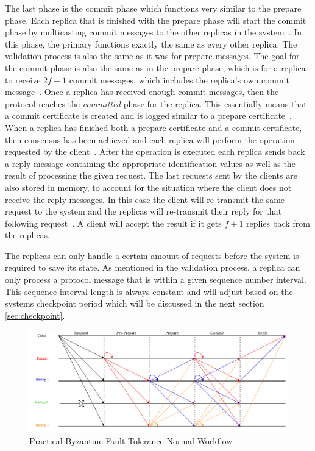 The last phase is the commit phase which functions very similar to the prepare phase. Each replica that is finished with the prepare phase will start the commit phase by multicasting commit messages to the other replicas in the system~\cite[p.~4]{PAPER:OGPBFT}. In this phase, the primary functions exactly the same as every other replica. The validation process is also the same as it was for prepare messages. The goal for the commit phase is also the same as in the prepare phase, which is for a replica to receive $2f+1$ commit messages, which includes the replica's own commit message~\cite[p.~5]{PAPER:OGPBFT}. Once a replica has received enough commit messages, then the protocol reaches the \emph{committed} phase for the replica. This essentially means that a commit certificate is created and is logged similar to a prepare certificate~\cites[p.~409]{PAPER:PBFTRecovery}[p.~457]{BOOK:MVstandver3}. When a replica has finished both a prepare certificate and a commit certificate, then consensus has been achieved and each replica will perform the operation requested by the client~\cites[p.~409]{PAPER:PBFTRecovery}[p.~5]{PAPER:OGPBFT}. After the operation is executed each replica sends back a reply message containing the appropriate identification values as well as the result of processing the given request. The last requests sent by the clients are also stored in memory, to account for the situation where the client does not receive the reply messages. In this case the client will re-transmit the same request to the system and the replicas will re-transmit their reply for that following request~\cite[p.~409]{PAPER:PBFTRecovery}. A client will accept the result if it gets $f+1$ replies back from the replicas.
 

The replicas can only handle a certain amount of requests before the system is required to save its state. As mentioned in the validation process, a replica can only process a protocol message that is within a given sequence number interval. This sequence interval length is always constant and will adjust based on the systems checkpoint period which will be discussed in the next section \autoref{sec:checkpoint}\cites[p.~262]{BOOK:BuildDepDistSyst}[p.~4-5]{PAPER:OGPBFT}.

\begin{figure}[!h]
	\centering
	\includegraphics[width=\linewidth]{figures/PBFTWorkflow}
	\caption{Practical Byzantine Fault Tolerance Normal Workflow}
	\label{fig:pbftnormalworkflow}
\end{figure}

